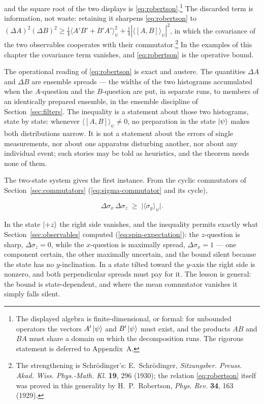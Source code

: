 and the square root of the two displays is \eqref{eq:robertson}.\footnote{The displayed algebra is finite-dimensional, or formal: for unbounded operators the vectors $A'\ket{\psi}$ and $B'\ket{\psi}$ must exist, and the products $AB$ and $BA$ must share a domain on which the decomposition runs. The rigorous statement is deferred to Appendix~A.} The discarded term is information, not waste: retaining it sharpens \eqref{eq:robertson} to $(\Delta A)^2(\Delta B)^2 \geq \tfrac{1}{4}\langle A'B' + B'A'\rangle_\psi^2 + \tfrac{1}{4}|\langle[A,B]\rangle_\psi|^2$, in which the covariance of the two observables cooperates with their commutator.\footnote{The strengthening is Schr\"odinger's: E.~Schr\"odinger, \emph{Sitzungsber. Preuss. Akad. Wiss. Phys.-Math. Kl.} \textbf{19}, 296 (1930); the relation \eqref{eq:robertson} itself was proved in this generality by H.~P.~Robertson, \emph{Phys. Rev.} \textbf{34}, 163 (1929).} In the examples of this chapter the covariance term vanishes, and \eqref{eq:robertson} is the operative bound.

The operational reading of \eqref{eq:robertson} is exact and austere. The quantities $\Delta A$ and $\Delta B$ are ensemble spreads --- the widths of the two histograms accumulated when the $A$-question and the $B$-question are put, in separate runs, to members of an identically prepared ensemble, in the ensemble discipline of Section~\ref{sec:filters}. The inequality is a statement about those two histograms, state by state: whenever $\langle[A,B]\rangle_\psi \neq 0$, no preparation in the state $\ket{\psi}$ makes both distributions narrow. It is not a statement about the errors of single measurements, nor about one apparatus disturbing another, nor about any individual event; such stories may be told as heuristics, and the theorem needs none of them.

The two-state system gives the first instance. From the cyclic commutators of Section~\ref{sec:commutators} (\eqref{eq:sigma-commutator} and its cycle),
\begin{linenomath}
    \begin{equation}
        \Delta\sigma_x\,\Delta\sigma_z \;\geq\; \bigl|\langle\sigma_y\rangle_\psi\bigr| .
    \end{equation}
\end{linenomath}
In the state $\ket{+z}$ the right side vanishes, and the inequality permits exactly what Section~\ref{sec:observables} computed (\eqref{eq:spin-expectation}): the $z$-question is sharp, $\Delta\sigma_z = 0$, while the $x$-question is maximally spread, $\Delta\sigma_x = 1$ --- one component certain, the other maximally uncertain, and the bound silent because the state has no $y$-inclination. In a state tilted toward the $y$-axis the right side is nonzero, and both perpendicular spreads must pay for it. The lesson is general: the bound is state-dependent, and where the mean commutator vanishes it simply falls silent.

